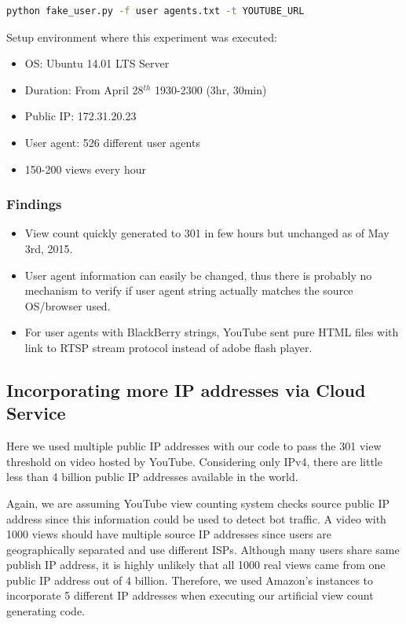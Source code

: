 \documentclass[conference]{IEEEtran}
\begin{document}
\begin{lstlisting}[frame=single, language=bash]
python fake_user.py -f user agents.txt -t YOUTUBE_URL
\end{lstlisting}

Setup environment where this experiment was executed:
\begin{itemize}
  \setlength\itemsep{-0.1em}
  \item OS: Ubuntu 14.01 LTS Server
  \item Duration: From April 28$^{th}$ 1930-2300 (3hr, 30min)
  \item Public IP: 172.31.20.23
  \item User agent: 526 different user agents
  \item 150-200 views every hour
\end{itemize}

\subsubsection*{Findings}
\begin{itemize}
  \setlength\itemsep{-0.1em}
  \item View count quickly generated to 301 in few hours but unchanged as of May 3rd, 2015.
  \item User agent information can easily be changed, thus there is probably no mechanism to verify if user agent string actually matches the source OS/browser used.
  \item For user agents with BlackBerry strings, YouTube sent pure HTML files with link to RTSP stream protocol instead of adobe flash player.
\end{itemize}


\subsection{Incorporating more IP addresses via Cloud Service}

Here we used multiple public IP addresses with our code to pass the 301 view threshold on video hosted by YouTube. Considering only IPv4, there are little less than 4 billion public IP addresses available in the world.

Again, we are assuming YouTube view counting system checks source public IP address since this information could be used to detect bot traffic. A video with 1000 views should have multiple source IP addresses since users are geographically separated and use different ISPs. Although many users share same publish IP address, it is highly unlikely that all 1000 real views came from one public IP address out of 4 billion. Therefore, we used Amazon’s instances to incorporate 5 different IP addresses when executing our artificial view count generating code.
\end{document}
